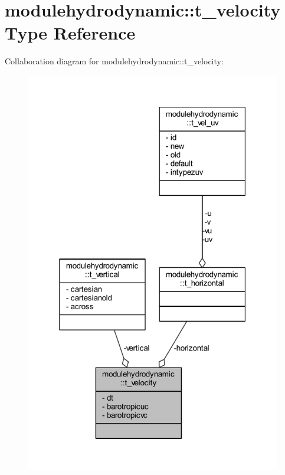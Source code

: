 \hypertarget{structmodulehydrodynamic_1_1t__velocity}{}\section{modulehydrodynamic\+:\+:t\+\_\+velocity Type Reference}
\label{structmodulehydrodynamic_1_1t__velocity}


Collaboration diagram for modulehydrodynamic\+:\+:t\+\_\+velocity\+:\nopagebreak
\begin{figure}[H]
\begin{center}
\leavevmode
\includegraphics[width=316pt]{structmodulehydrodynamic_1_1t__velocity__coll__graph}
\end{center}
\end{figure}
